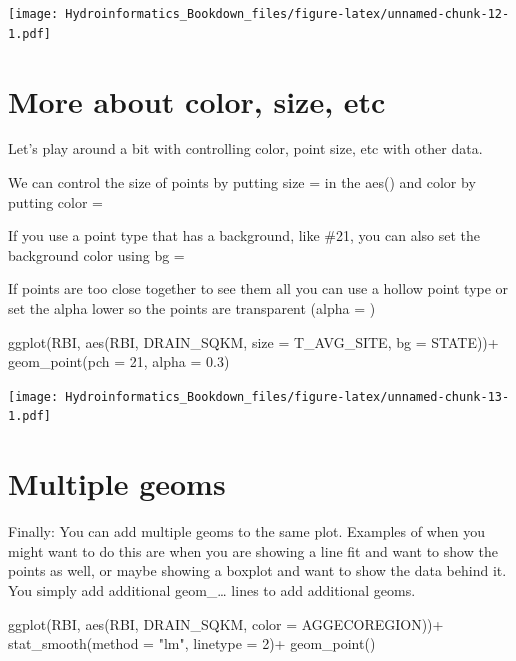 \documentclass[
]{book}
\newenvironment{Shaded}{\begin{snugshade}}{\end{snugshade}}
\newcommand{\AttributeTok}[1]{\textcolor[rgb]{0.77,0.63,0.00}{#1}}
\newcommand{\DecValTok}[1]{\textcolor[rgb]{0.00,0.00,0.81}{#1}}
\newcommand{\FloatTok}[1]{\textcolor[rgb]{0.00,0.00,0.81}{#1}}
\newcommand{\FunctionTok}[1]{\textcolor[rgb]{0.00,0.00,0.00}{#1}}
\newcommand{\NormalTok}[1]{#1}
\newcommand{\SpecialCharTok}[1]{\textcolor[rgb]{0.00,0.00,0.00}{#1}}
\newcommand{\StringTok}[1]{\textcolor[rgb]{0.31,0.60,0.02}{#1}}
\begin{document}
\texttt{[image: Hydroinformatics\_Bookdown\_files/figure-latex/unnamed-chunk-12-1.pdf]}

\hypertarget{more-about-color-size-etc}{%
\section{More about color, size, etc}\label{more-about-color-size-etc}}

Let's play around a bit with controlling color, point size, etc with other data.

We can control the size of points by putting size = in the aes() and color by putting color =

If you use a point type that has a background, like \#21, you can also set the background color using bg =

If points are too close together to see them all you can use a hollow point type or set the alpha lower so the points are transparent (alpha = )

\begin{Shaded}
\begin{Highlighting}[]
\FunctionTok{ggplot}\NormalTok{(RBI, }\FunctionTok{aes}\NormalTok{(RBI, DRAIN\_SQKM, }\AttributeTok{size =}\NormalTok{ T\_AVG\_SITE, }\AttributeTok{bg =}\NormalTok{ STATE))}\SpecialCharTok{+}
  \FunctionTok{geom\_point}\NormalTok{(}\AttributeTok{pch =} \DecValTok{21}\NormalTok{, }\AttributeTok{alpha =} \FloatTok{0.3}\NormalTok{)}
\end{Highlighting}
\end{Shaded}

\texttt{[image: Hydroinformatics\_Bookdown\_files/figure-latex/unnamed-chunk-13-1.pdf]}

\hypertarget{multiple-geoms}{%
\section{Multiple geoms}\label{multiple-geoms}}

Finally: You can add multiple geoms to the same plot. Examples of when you might want to do this are when you are showing a line fit and want to show the points as well, or maybe showing a boxplot and want to show the data behind it. You simply add additional geom\_\ldots{} lines to add additional geoms.

\begin{Shaded}
\begin{Highlighting}[]
\FunctionTok{ggplot}\NormalTok{(RBI, }\FunctionTok{aes}\NormalTok{(RBI, DRAIN\_SQKM, }\AttributeTok{color =}\NormalTok{ AGGECOREGION))}\SpecialCharTok{+}
  \FunctionTok{stat\_smooth}\NormalTok{(}\AttributeTok{method =} \StringTok{"lm"}\NormalTok{, }\AttributeTok{linetype =} \DecValTok{2}\NormalTok{)}\SpecialCharTok{+}
  \FunctionTok{geom\_point}\NormalTok{()}
\end{Highlighting}
\end{Shaded}
\end{document}
